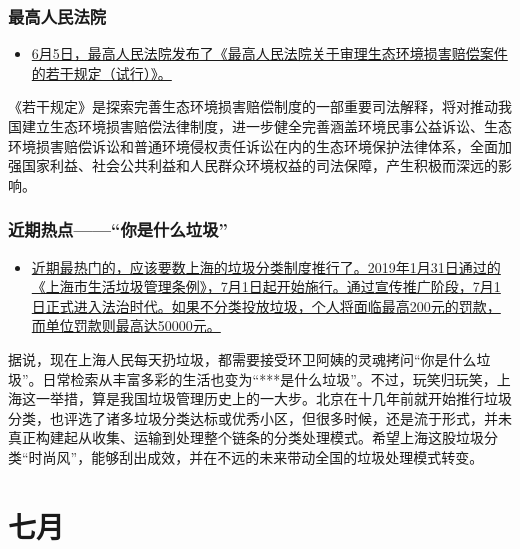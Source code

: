 \documentclass[
]{book}
\providecommand{\tightlist}{%
  \setlength{\itemsep}{0pt}\setlength{\parskip}{0pt}}
\begin{document}
\hypertarget{ux6700ux9ad8ux4ebaux6c11ux6cd5ux9662}{%
\subsubsection*{最高人民法院}\label{ux6700ux9ad8ux4ebaux6c11ux6cd5ux9662}}

\begin{itemize}
\tightlist
\item
  \href{http://www.hncourt.gov.cn/public/detail.php?id=177804}{6月5日，最高人民法院发布了《最高人民法院关于审理生态环境损害赔偿案件的若干规定（试行）》。}
\end{itemize}

《若干规定》是探索完善生态环境损害赔偿制度的一部重要司法解释，将对推动我国建立生态环境损害赔偿法律制度，进一步健全完善涵盖环境民事公益诉讼、生态环境损害赔偿诉讼和普通环境侵权责任诉讼在内的生态环境保护法律体系，全面加强国家利益、社会公共利益和人民群众环境权益的司法保障，产生积极而深远的影响。

\hypertarget{ux8fd1ux671fux70edux70b9ux4f60ux662fux4ec0ux4e48ux5783ux573e}{%
\subsubsection*{近期热点------``你是什么垃圾''}\label{ux8fd1ux671fux70edux70b9ux4f60ux662fux4ec0ux4e48ux5783ux573e}}

\begin{itemize}
\tightlist
\item
  \href{http://www.hncourt.gov.cn/public/detail.php?id=177804}{近期最热门的，应该要数上海的垃圾分类制度推行了。2019年1月31日通过的《上海市生活垃圾管理条例》，7月1日起开始施行。通过宣传推广阶段，7月1日正式进入法治时代。如果不分类投放垃圾，个人将面临最高200元的罚款，而单位罚款则最高达50000元。}
\end{itemize}

据说，现在上海人民每天扔垃圾，都需要接受环卫阿姨的灵魂拷问``你是什么垃圾''。日常检索从丰富多彩的生活也变为``***是什么垃圾''。不过，玩笑归玩笑，上海这一举措，算是我国垃圾管理历史上的一大步。北京在十几年前就开始推行垃圾分类，也评选了诸多垃圾分类达标或优秀小区，但很多时候，还是流于形式，并未真正构建起从收集、运输到处理整个链条的分类处理模式。希望上海这股垃圾分类``时尚风''，能够刮出成效，并在不远的未来带动全国的垃圾处理模式转变。

\hypertarget{ux4e03ux6708-1}{%
\section*{七月}\label{ux4e03ux6708-1}}
\end{document}

